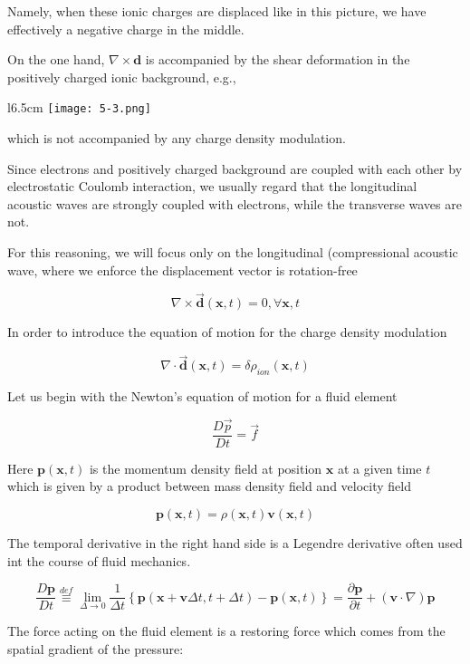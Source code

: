 ﻿\documentclass[twoside]{book}
\numberwithin{equation}{section}
\begin{document}
Namely, when these ionic charges are displaced like in this picture, we have effectively a negative charge in the middle. 

On the one hand, $\nabla\times\bm{d}$ is accompanied by the shear deformation in the positively charged ionic background, e.g.,

\begin{figure}
\end{figure}
\begin{wrapfigure}{l}{6.5cm}
\texttt{[image: 5-3.png]}
\end{wrapfigure}

which is not accompanied by any charge density modulation. 

Since electrons and positively charged background are coupled with each other by electrostatic Coulomb interaction, we usually regard that the longitudinal acoustic waves are strongly coupled with electrons, while the transverse waves are not. 

For this reasoning, we will focus only on the longitudinal (compressional acoustic wave, where we enforce the displacement vector is rotation-free

\[\nabla\times\vec{\bm{d}}(\bm{x},t) = 0,\forall\bm{x},t \]

In order to introduce the equation of motion for the charge density modulation

\[\nabla\cdot\vec{\bm{d}}(\bm{x},t) = \delta\rho_{ion}(\bm{x},t) \]

Let us begin with the Newton's equation of motion for a fluid element

\[\frac{D\vec{p}}{Dt} = \vec{f} \]

Here $\bm{p}(\bm{x},t)$ is the momentum density field at position $\bm{x}$ at a given time $t$ which is given by a product between mass density field and velocity field

\[\bm{p}(\bm{x},t) = \rho(\bm{x},t)\bm{v}(\bm{x},t) \]

The temporal derivative in the right hand side is a Legendre derivative often used int the course of fluid mechanics. 

\[\frac{D\bm{p}}{Dt} \overset{def}{\equiv}\lim_{\Delta\rightarrow0}\frac{1}{\Delta t} \left\{\bm{p}(\bm{x}+\bm{v}\Delta t,t+\Delta t) - \bm{p}(\bm{x},t)\right\} = \frac{\partial\bm{p}}{\partial t}+(\bm{v}\cdot\nabla)\bm{p} \]

The force acting on the fluid element is a restoring force which comes from the spatial gradient of the pressure:
\end{document}
